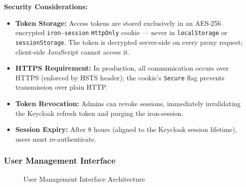 \begin{mdframed}[backgroundcolor=yellow!10, linecolor=orange!60, linewidth=2pt]
\textbf{Security Considerations:}

\begin{itemize}
    \item \textbf{Token Storage:} Access tokens are stored exclusively in
          an AES-256 encrypted \texttt{iron-session} \texttt{HttpOnly} cookie
          --- never in \texttt{localStorage} or \texttt{sessionStorage}.
          The token is decrypted server-side on every proxy request; client-side
          JavaScript cannot access it.
    \item \textbf{HTTPS Requirement:} In production, all communication occurs
          over HTTPS (enforced by HSTS header); the cookie's \texttt{Secure}
          flag prevents transmission over plain HTTP.
    \item \textbf{Token Revocation:} Admins can revoke sessions, immediately
          invalidating the Keycloak refresh token and purging the iron-session.
    \item \textbf{Session Expiry:} After 8 hours (aligned to the Keycloak
          session lifetime), users must re-authenticate.
\end{itemize}
\end{mdframed}

\subsubsection{User Management Interface}

\begin{figure}[H]
\centering
{}
\caption{User Management Interface Architecture}
\end{figure}

